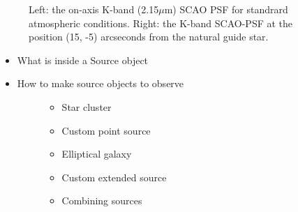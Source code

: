 \begin{figure}[H]
\noindent{}\label{fig-scopesim-templates-cluster-example}

\caption{Left: the on-axis K-band (2.15$\mu$m) SCAO PSF for standrard atmospheric conditions.
Right: the K-band SCAO-PSF at the position (15, -5) arcseconds from the natural guide star.}
\end{figure}

\begin{itemize}
\item What is inside a Source object

\item 
\begin{description}
\item[{How to make source objects to observe}] \leavevmode 
\begin{itemize}
\item Star cluster

\item Custom point source

\item Elliptical galaxy

\item Custom extended source

\item Combining sources
\end{itemize}

\end{description}
\end{itemize}
